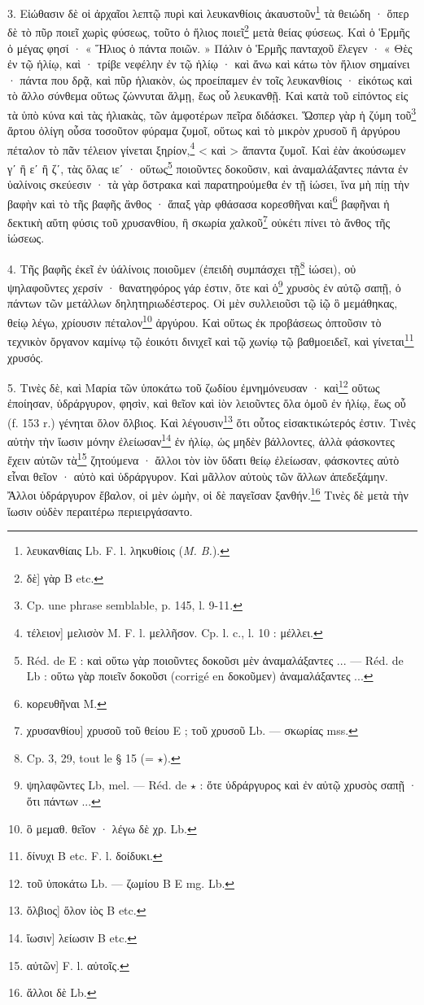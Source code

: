 \documentclass[a4paper, 11pt, oneside, polutonikogreek, french]{article}
\begin{document}
3. Εἰώθασιν δὲ οἱ ἀρχαῖοι λεπτῷ πυρὶ καὶ λευκανθίοις ἀκαυστοῦν\footnote{λευκανθίαις Lb. F. l. ληκυθίοις (\emph{M. B.}).} τὰ θειώδη · ὅπερ δὲ τὸ πῦρ ποιεῖ χωρὶς φύσεως, τοῦτο ὁ ἥλιος ποιεῖ\footnote{δὲ] γὰρ B etc.} μετὰ θείας φύσεως. Καὶ ὁ Ἑρμῆς ὁ μέγας φησί · « Ἥλιος ὁ πάντα ποιῶν. » Πάλιν ὁ Ἑρμῆς πανταχοῦ ἔλεγεν · « Θὲς ἐν τῷ ἡλίῳ, καὶ · τρίβε νεφέλην ἐν τῷ ἡλίῳ · καὶ ἄνω καὶ κάτω τὸν ἥλιον σημαίνει · πάντα που δρᾷ, καὶ πῦρ ἡλιακὸν, ὡς προείπαμεν ἐν τοῖς λευκανθίοις · εἰκότως καὶ τὸ ἄλλο σύνθεμα οὕτως ζώννυται ἅλμῃ, ἕως οὗ λευκανθῇ. Καὶ κατὰ τοῦ εἰπόντος εἰς τὰ ὑπὸ κύνα καὶ τὰς ἡλιακὰς, τῶν ἀμφοτέρων πεῖρα διδάσκει. Ὥσπερ γὰρ ἡ ζύμη τοῦ\footnote{Cp. une phrase semblable, p. 145, l. 9-11.} ἄρτου ὀλίγη οὖσα τοσοῦτον φύραμα ζυμοῖ, οὕτως καὶ τὸ μικρὸν χρυσοῦ ἢ ἀργύρου πέταλον τὸ πᾶν τέλειον γίνεται ξηρίον,\footnote{τέλειον] μελισὸν M. F. l. μελλῆσον. Cp. l. c., l. 10 : μέλλει.} < καὶ > ἅπαντα ζυμοῖ. Καὶ ἐὰν ἀκούσωμεν γʹ ἢ εʹ ἢ ζʹ, τὰς ὅλας ιεʹ · οὕτως\footnote{Réd. de E : καὶ οὕτω γὰρ ποιοῦντες δοκοῦσι μὲν ἀναμαλάξαντες ... --- Réd. de Lb : οὕτω γὰρ ποιεῖν δοκοῦσι (corrigé en δοκοῦμεν) ἀναμαλάξαντες ...} ποιοῦντες δοκοῦσιν, καὶ ἀναμαλάξαντες πάντα ἐν ὑαλίνοις σκεύεσιν · τὰ γὰρ ὄστρακα καὶ παρατηρούμεθα ἐν τῇ ἰώσει, ἵνα μὴ πίῃ τὴν βαφὴν καὶ τὸ τῆς βαφῆς ἄνθος · ἅπαξ γὰρ φθάσασα κορεσθῆναι καὶ\footnote{κορευθῆναι M.} βαφῆναι ἡ δεκτικὴ αὕτη φύσις τοῦ χρυσανθίου, ἢ σκωρία χαλκοῦ\footnote{χρυσανθίου] χρυσοῦ τοῦ θείου E ; τοῦ χρυσοῦ Lb. --- σκωρίας mss.} οὐκέτι πίνει τὸ ἄνθος τῆς ἰώσεως.

4. Τῆς βαφῆς ἐκεῖ ἐν ὑάλίνοις ποιοῦμεν (ἐπειδὴ συμπάσχει τῇ\footnote{Cp. 3, 29, tout le § 15 (= $\star$).} ἰώσει), οὐ ψηλαφοῦντες χερσίν · θανατηφόρος γάρ ἐστιν, ὅτε καὶ ὁ\footnote{ψηλαφῶντες Lb, mel. --- Réd. de $\star$ : ὅτε ὑδράργυρος καὶ ἐν αὐτῷ χρυσὸς σαπῇ · ὅτι πάντων ...} χρυσὸς ἐν αὐτῷ σαπῇ, ὁ πάντων τῶν μετάλλων δηλητηριωδέστερος. Οἱ μὲν συλλειοῦσι τῷ ἰῷ ὃ μεμάθηκας, θείῳ λέγω, χρίουσιν πέταλον\footnote{ὃ μεμαθ. θεῖον · λέγω δὲ χρ. Lb.} ἀργύρου. Καὶ οὕτως ἐκ προβάσεως ὀπτοῦσιν τὸ τεχνικὸν ὄργανον καμίνῳ τῷ ἐοικότι δινιχεῖ καὶ τῷ χωνίῳ τῷ βαθμοειδεῖ, καὶ γίνεται\footnote{δίνυχι B etc. F. l. δοίδυκι.} χρυσός.

5. Τινὲς δὲ, καὶ Μαρία τῶν ὑποκάτω τοῦ ζωδίου ἐμνημόνευσαν · καὶ\footnote{τοῦ ὑποκάτω Lb. --- ζωμίου B E mg. Lb.} οὕτως ἐποίησαν, ὑδράργυρον, φησὶν, καὶ θεῖον καὶ ἰὸν λειοῦντες ὅλα ὁμοῦ ἐν ἡλίῳ, ἕως οὗ (f. 153 r.) γένηται ὅλον ὄλβιος. Καὶ λέγουσιν\footnote{ὄλβιος] ὅλον ἰὸς B etc.} ὅτι οὗτος εἰσακτικώτερός ἐστιν. Τινὲς αὐτὴν τὴν ἴωσιν μόνην ἐλείωσαν\footnote{ἴωσιν] λείωσιν B etc.} ἐν ἡλίῳ, ὡς μηδὲν βάλλοντες, ἀλλὰ φάσκοντες ἔχειν αὐτῶν τὰ\footnote{αὐτῶν] F. l. αὐτοῖς.} ζητούμενα · ἄλλοι τὸν ἰὸν ὕδατι θείῳ ἐλείωσαν, φάσκοντες αὐτὸ εἶναι θεῖον · αὐτὸ καὶ ὑδράργυρον. Καὶ μᾶλλον αὐτοὺς τῶν ἄλλων ἀπεδεξάμην. Ἄλλοι ὑδράργυρον ἔβαλον, οἱ μὲν ὠμὴν, οἱ δὲ παγεῖσαν ξανθήν.\footnote{ἄλλοι δὲ Lb.} Τινὲς δὲ μετὰ τὴν ἴωσιν οὐδὲν περαιτέρω περιειργάσαντο.
\end{document}
